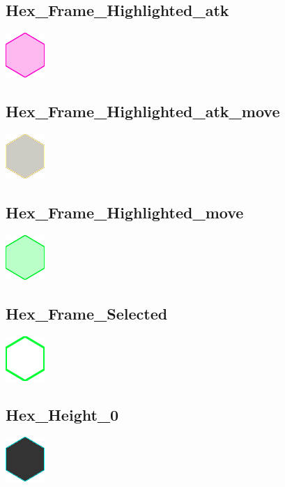 \documentclass[a4paper,12pt]{scrartcl}
\begin{document}
	\subsection{Hex\_Frame\_Highlighted\_atk}
	\begin{center}\includegraphics{Prog2_EA_V2/Art/Hex_Frame_Highlighted_atk.png}\end{center}
	\subsection{Hex\_Frame\_Highlighted\_atk\_move}
	\begin{center}\includegraphics{Prog2_EA_V2/Art/Hex_Frame_Highlighted_atk_move.png}\end{center}
	\subsection{Hex\_Frame\_Highlighted\_move}
	\begin{center}\includegraphics{Prog2_EA_V2/Art/Hex_Frame_Highlighted_move.png}\end{center}
	\subsection{Hex\_Frame\_Selected}
	\begin{center}\includegraphics{Prog2_EA_V2/Art/Hex_Frame_Selected.png}\end{center}
	\subsection{Hex\_Height\_0}
	\begin{center}\includegraphics{Prog2_EA_V2/Art/Hex_Height_0.png}\end{center}
\end{document}
